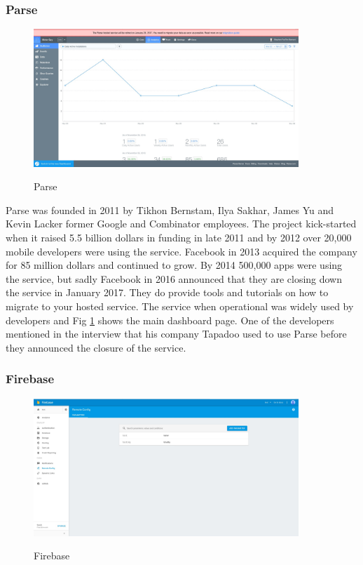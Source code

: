 \subsubsection{Parse}

\begin{figure}[!h]
    \caption{Parse}
    \centering
    \includegraphics[width=100mm]{images/parse}
    \label{fig:parse}
\end{figure}

Parse \cite{parse} was founded in 2011 by Tikhon Bernstam, Ilya Sakhar, James Yu and Kevin Lacker former Google and Combinator employees. The project kick-started when it raised 5.5 billion dollars in funding in late 2011 and by 2012 over 20,000 mobile developers were using the service. Facebook in 2013 acquired the company for 85 million dollars and continued to grow. By 2014 500,000 apps were using the service, but sadly Facebook in 2016 announced that they are closing down the service in January 2017. They do provide tools and tutorials on how to migrate to your hosted service. The service when operational was widely used by developers and Fig \ref{fig:parse} shows the main dashboard page. One of the developers mentioned in the interview that his company Tapadoo used to use Parse before they announced the closure of the service.

\subsubsection{Firebase}

\begin{figure}[!h]
    \caption{Firebase}
    \centering
    \includegraphics[width=100mm]{images/firebase}
    \label{fig:firebase}
\end{figure}

